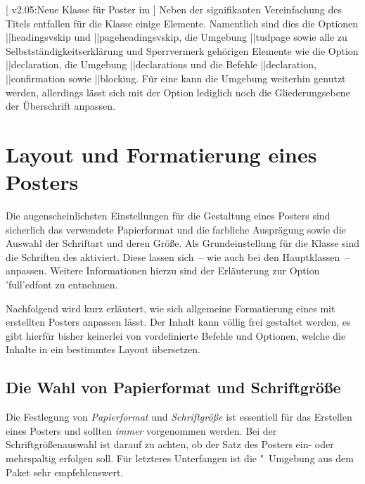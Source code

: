 \begin{DeclareEntity}{}[%
  v2.05:Neue Klasse für Poster im \TUDCD%
]
Neben der signifikanten Vereinfachung des Titels entfallen für die Klasse 
 einige Elemente. Namentlich sind dies die Optionen 
\Option||{headingsvskip} und \Option||{pageheadingsvskip}, die Umgebung 
\Environment||{tudpage} sowie alle zu Selbstständigkeitserklärung und 
Sperrvermerk gehörigen Elemente wie die Option \Option||{declaration}, die 
Umgebung \Environment||{declarations} und die Befehle \Macro||{declaration}, 
\Macro||{confirmation} sowie \Macro||{blocking}. Für eine \abstractname{} 
kann die Umgebung  weiterhin genutzt werden, allerdings 
lässt sich mit der Option  lediglich noch die Gliederungsebene 
der Überschrift anpassen.



\section{Layout und Formatierung eines Posters}
%
Die augenscheinlichsten Einstellungen für die Gestaltung eines Posters sind 
sicherlich das verwendete Papierformat und die farbliche Ausprägung sowie die 
Auswahl der Schriftart und deren Größe. Als Grundeinstellung für die Klasse
 sind die Schriften des \TUDCDs aktiviert. Diese lassen 
sich~-- wie auch bei den Hauptklassen~-- anpassen. Weitere Informationen hierzu 
sind der Erläuterung zur Option \Option'full'{cdfont} zu entnehmen.

Nachfolgend wird kurz erläutert, wie sich allgemeine Formatierung eines mit 
 erstellten Posters anpassen lässt. Der Inhalt kann völlig 
frei gestaltet werden, es gibt hierfür bisher keinerlei von \TUDScript 
vordefinierte Befehle und Optionen, welche die Inhalte in ein bestimmtes Layout 
übersetzen.



\subsection{%
  Die Wahl von Papierformat und Schriftgröße%
  \label{sec:fontsize}%
}
%
Die Festlegung von \emph{Papierformat} und \emph{Schriftgröße} ist essentiell 
für das Erstellen eines Posters und sollten \emph{immer} vorgenommen werden. 
Bei der Schriftgrößenauswahl ist darauf zu achten, ob der Satz des Posters 
ein- oder mehrspaltig erfolgen soll. Für letzteres Unterfangen ist die 
"~Umgebung aus dem Paket  sehr 
empfehlenswert. 


\end{DeclareEntity}
